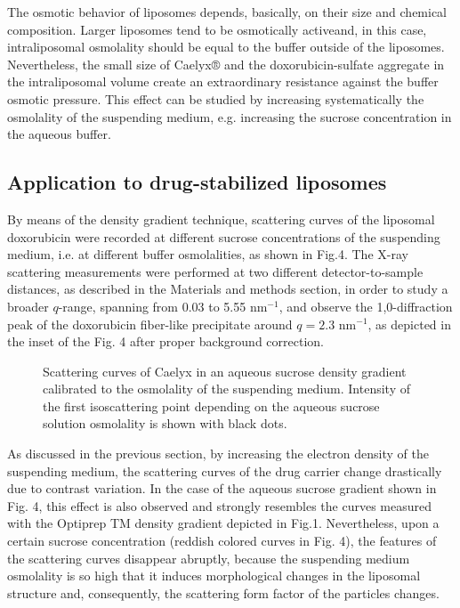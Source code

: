 The osmotic behavior of liposomes depends, basically, on their size and chemical composition. Larger liposomes tend to be osmotically activeand, in this case, intraliposomal osmolality should be equal to the buffer outside of the liposomes. Nevertheless, the small size of Caelyx® and the doxorubicin-sulfate aggregate in the intraliposomal volume create an extraordinary resistance against the buffer osmotic pressure. This effect can be studied by increasing systematically the osmolality of the suspending medium, e.g. increasing the sucrose concentration in the aqueous buffer.

\subsection{Application to drug-stabilized liposomes}

By means of the density gradient technique, scattering curves of the liposomal doxorubicin were recorded at different sucrose concentrations of the suspending medium, i.e. at different buffer osmolalities, as shown in Fig.4. The X-ray scattering measurements were performed at two different detector-to-sample distances, as described in the Materials and methods section, in order to study a broader $q$-range, spanning from 0.03 to 5.55 nm$^{-1}$, and observe the 1,0-diffraction peak of the doxorubicin fiber-like precipitate around $q=2.3$ nm$^{-1}$, as depicted in the inset of the Fig. 4 after proper background correction.

\begin{figure}
	\centering
		\caption{Scattering curves of Caelyx in an aqueous sucrose density gradient calibrated to the osmolality of the suspending medium. Intensity of the first isoscattering point depending on the aqueous sucrose solution osmolality is shown with black dots.}
\end{figure}

As discussed in the previous section, by increasing the electron density of the suspending medium, the scattering curves of the drug carrier change drastically due to contrast variation. In the case of the aqueous sucrose gradient shown in Fig. 4, this effect is also observed and strongly resembles the curves measured with the Optiprep TM density gradient depicted in Fig.1. Nevertheless, upon a certain sucrose concentration (reddish colored curves in Fig. 4), the features of the scattering curves disappear abruptly, because the suspending medium osmolality is so high that it induces morphological changes in the liposomal structure and, consequently, the scattering form factor of the particles changes.

